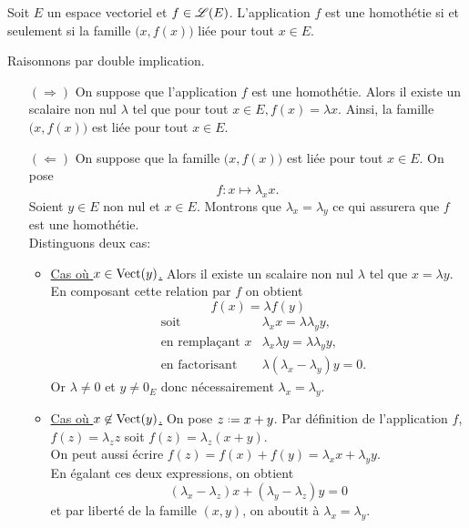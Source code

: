 \begin{prop}
    Soit $E$ un espace vectoriel et $f \in \mathscr{L}(E)$. L'application $f$ est une homothétie si et seulement si la famille $\big(x, f(x) \big)$ liée pour tout $x \in E$.
\end{prop}

\begin{marginfigure}
    \centering
    
\end{marginfigure}

\begin{preuve}
    Raisonnons par double implication. 
    \begin{itemize}
        \item[$(\Rightarrow)$] On suppose que l'application $f$ est une homothétie. Alors il existe un scalaire non nul $\lambda$ tel que pour tout $x \in E, f(x) = \lambda x$. Ainsi, la famille $\big(x, f(x) \big)$ est liée pour tout $x \in E$. 
        \item[$(\Leftarrow)$]  On suppose que la famille $\big(x, f(x) \big)$ est liée pour tout $x \in E$. On pose 
        $$f:x \mapsto \lambda_x x.$$
        Soient $y \in E$ non nul et $x \in E$. Montrons que $\lambda_x = \lambda_{y}$ ce qui assurera que $f$ est une homothétie. \\
        Distinguons deux cas:
        \begin{itemize}
            \item \underline{Cas où $x \in \mathrm{Vect}(y)$.} Alors il existe un scalaire non nul $\lambda$ tel que $x = \lambda y$. En composant cette relation par $f$ on obtient
            $$f(x) = \lambda f(y)$$
            \begin{align*}
                &\text{soit} &\lambda_x x = \lambda \lambda_{y} y, \\
                &\text{en remplaçant $x$} &\lambda_x \lambda y = \lambda \lambda_{y} y, \\
                &\text{en factorisant} &\lambda (\lambda_x - \lambda_{y}) y = 0.
            \end{align*}
            Or $\lambda \not= 0$ et $y \not= 0_E$ donc nécessairement $\lambda_x = \lambda_{y}$.
            \item \underline{Cas où $x \not \in \mathrm{Vect}(y)$.} On pose $z \defeq x + y$. Par définition de l'application $f$, $f(z) = \lambda_z z$ soit $f(z) = \lambda_z(x + y)$. \\
            On peut aussi écrire $f(z) = f(x) + f(y) = \lambda_x x + \lambda_y y$. \\
            En égalant ces deux expressions, on obtient 
            $$(\lambda_x - \lambda_z) x + (\lambda_{y} - \lambda_z) y = 0$$
            et par liberté de la famille $(x, y)$, on aboutit à $\lambda_x = \lambda_{y}$.
        \end{itemize}
    \end{itemize}
\end{preuve}

